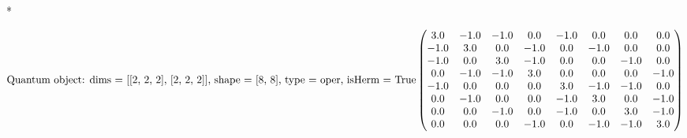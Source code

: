 \documentclass[letterpaper,10pt,english]{/usr/local/lib/python2.7/dist-packages/sphinx/texinputs/sphinxhowto}
\def\smaller{\fontsize{9.5pt}{9.5pt}\selectfont}
\newenvironment{InvisibleVerbatim}
        {\begin{mdframed}[leftmargin=0.1\linewidth,innerleftmargin=3pt,innerrightmargin=3pt, userdefinedwidth=1\linewidth, linewidth=0pt, linecolor=white, usetwoside=false]}
        {\end{mdframed}}
\begin{document}
        

            
                \makebox[0.1\linewidth]{\smaller\hfill\tt\color{nbframe-out-prompt}Out\hspace{4pt}{[}168{]}:\hspace{4pt}}\\*
                \vspace{-2.55\baselineskip}\begin{InvisibleVerbatim}
                \vspace{-0.5\baselineskip}
\begin{equation}\text{Quantum object: dims = [[2, 2, 2], [2, 2, 2]], shape = [8, 8], type = oper, isHerm = True}\\[1em]\begin{pmatrix}3.0 & -1.0 & -1.0 & 0.0 & -1.0 & 0.0 & 0.0 & 0.0\\-1.0 & 3.0 & 0.0 & -1.0 & 0.0 & -1.0 & 0.0 & 0.0\\-1.0 & 0.0 & 3.0 & -1.0 & 0.0 & 0.0 & -1.0 & 0.0\\0.0 & -1.0 & -1.0 & 3.0 & 0.0 & 0.0 & 0.0 & -1.0\\-1.0 & 0.0 & 0.0 & 0.0 & 3.0 & -1.0 & -1.0 & 0.0\\0.0 & -1.0 & 0.0 & 0.0 & -1.0 & 3.0 & 0.0 & -1.0\\0.0 & 0.0 & -1.0 & 0.0 & -1.0 & 0.0 & 3.0 & -1.0\\0.0 & 0.0 & 0.0 & -1.0 & 0.0 & -1.0 & -1.0 & 3.0\\\end{pmatrix}\end{equation}
            \end{InvisibleVerbatim}
            
        
    


\end{document}
